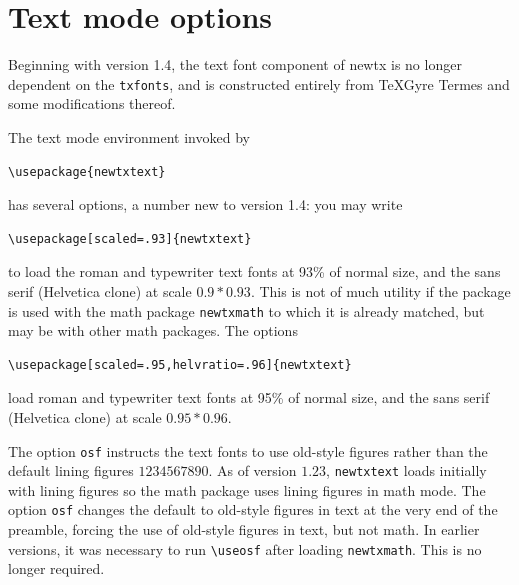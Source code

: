 \documentclass[11pt]{article}
\theoremstyle{oldplain}
\theoremstyle{plain}
\begin{document}
\section{Text mode options}
Beginning with version 1.4, the text font component of \textsf{newtx} is no longer dependent on the {\tt txfonts}, and is constructed entirely from \textsf{TeXGyre Termes} and some modifications thereof.

The text mode environment invoked by
\begin{verbatim}
\usepackage{newtxtext}
\end{verbatim}
has several options, a number new to version 1.4: you may write
\begin{verbatim}
\usepackage[scaled=.93]{newtxtext}
\end{verbatim}
to load the roman and typewriter text fonts at 93\% of normal size, and the sans serif (\textsf{Helvetica} clone) at scale $0.9*0.93$. This is not of much utility if the package is used with the math package {\tt newtxmath} to which it is already matched, but may be with other math packages. The options
\begin{verbatim}
\usepackage[scaled=.95,helvratio=.96]{newtxtext}
\end{verbatim}
load roman and typewriter text fonts at 95\% of normal size, and the sans serif (\textsf{Helvetica} clone) at scale $0.95*0.96$.

The option \texttt{osf} instructs the text fonts to use old-style figures  rather than the default lining figures $1234567890$. As of version $1.23$, {\tt newtxtext} loads initially with lining figures so the math package uses lining figures in math mode. The option {\tt osf} changes the default to old-style figures in text at the very end of the preamble, forcing the use of old-style figures in text, but not math. In earlier versions, it was necessary to run 
\verb|\useosf| after loading {\tt newtxmath}. This is no longer required. 
\end{document}

